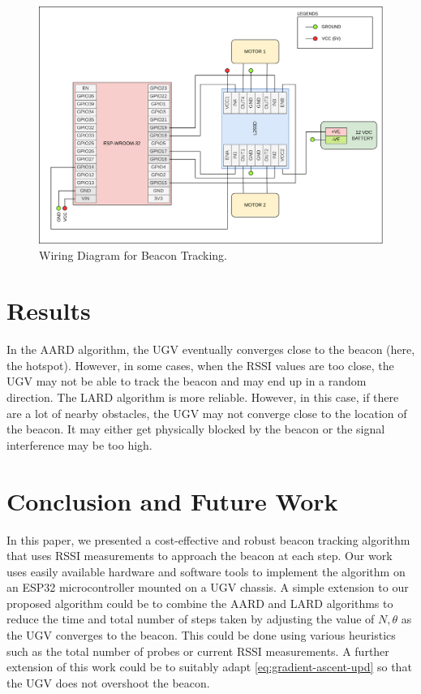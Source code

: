 \documentclass[conference]{IEEEtran}
\begin{document}
\begin{figure}[t]
    \centering
    \includegraphics[width=\columnwidth]{figs/beacon.png}
    \caption{Wiring Diagram for Beacon Tracking.}
    \label{fig:beacon}
\end{figure}

\section{Results}
\label{sec:results}
In the AARD algorithm, the UGV eventually converges close to the beacon (here,
the hotspot). However, in some cases, when the RSSI values are too close, the
UGV may not be able to track the beacon and may end up in a random direction.
The LARD algorithm is more reliable.  However,  in this case, if there are a lot
of nearby obstacles, the UGV may not converge close to the location of the
beacon. It may either get physically blocked by the beacon or the signal
interference may be too high.

\section{Conclusion and Future Work}
\label{sec:conclusion}

In this paper, we presented a cost-effective and robust beacon tracking
algorithm that uses RSSI measurements to approach the beacon at each step. Our
work uses easily available hardware and software tools to implement the
algorithm on an ESP32 microcontroller mounted on a UGV chassis. A simple
extension to our proposed algorithm could be to combine the AARD and LARD
algorithms to reduce the time and total number of steps taken by adjusting the
value of \(N, \theta\) as the UGV converges to the beacon. This could be done
using various heuristics such as the total number of probes or current RSSI
measurements. A further extension of this work could be to suitably adapt
\eqref{eq:gradient-ascent-upd} so that the UGV does not overshoot the beacon.
%


\end{document}
